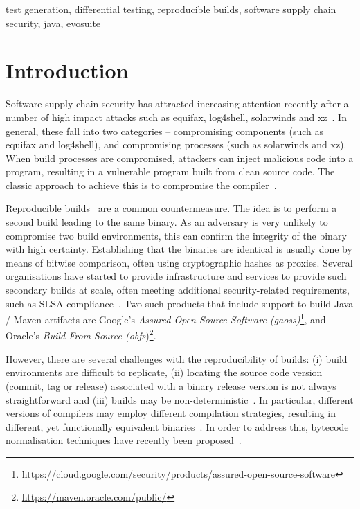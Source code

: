 \documentclass[conference]{IEEEtran}
\begin{document}
\begin{IEEEkeywords}
test generation, differential testing, reproducible builds, software supply chain security, java, evosuite
\end{IEEEkeywords}

\section{Introduction}

Software supply chain security has attracted increasing attention recently after a number of high impact attacks such as \textsf{equifax}, \textsf{log4shell}, \textsf{solarwinds} and \textsf{xz}~\cite{ellison2010evaluating,martinez2021software,enck2022top,EO14028}. In general, these fall into two categories -- compromising components (such as \textsf{equifax} and \textsf{log4shell}), and compromising processes (such as \textsf{solarwinds} and \textsf{xz}). When build processes are compromised, attackers can inject malicious code into a program, resulting in a vulnerable program built from clean source code. The classic approach to achieve this is to compromise the compiler~\cite{thompson1984reflections}. 

Reproducible builds~\cite{reproduciblebuild, lamb2021reproducible} are a common countermeasure. The idea is to perform a second build leading to the same binary. As an adversary is very unlikely to compromise two build environments, this can confirm the integrity of the binary with high certainty. Establishing that the binaries are identical is usually done by means of bitwise comparison, often using cryptographic hashes as proxies.
Several organisations have started to provide infrastructure and services to provide such secondary builds at scale, often meeting additional security-related requirements, such as SLSA compliance~\cite{slsa}. Two such products that include support to build Java / Maven artifacts are Google's \textit{Assured Open Source Software (gaoss)}\footnote{\url{https://cloud.google.com/security/products/assured-open-source-software}}, and Oracle's \textit{Build-From-Source (obfs})\footnote{\url{https://maven.oracle.com/public/}}.

However, there are several challenges with the reproducibility of builds: (i) build environments are difficult to replicate, (ii) locating the source code version (commit, tag or release) associated with a binary release version is not always straightforward and (iii) builds may be non-deterministic~\cite{xiong2022towards,hassanshahi2023macaron,bineqdataset,keshani2024aroma}. In particular, different versions of compilers may employ different compilation strategies, resulting in different, yet functionally equivalent binaries~\cite{xiong2022towards,bineqdataset,schott2024JNorm}.  
In order to address this, bytecode normalisation techniques have recently been proposed~\cite{xiong2022towards,dietrich2024levelsbinaryequivalencecomparison,schott2024JNorm}. 
\end{document}
